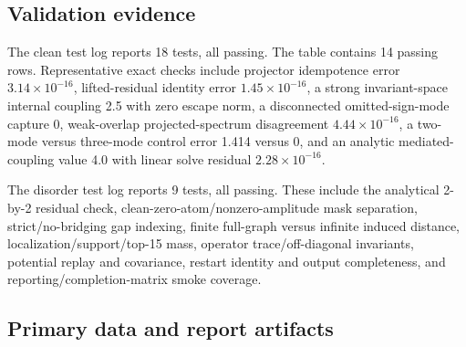 \documentclass[11pt]{article}
\begin{document}
\subsection{Validation evidence}

The clean test log
reports 18 tests, all passing.  The table
contains 14 passing rows.  Representative exact checks include projector idempotence error
\(3.14\times10^{-16}\), lifted-residual identity error \(1.45\times10^{-16}\), a strong invariant-space internal coupling 2.5 with zero escape norm, a disconnected omitted-sign-mode capture 0, weak-overlap projected-spectrum disagreement \(4.44\times10^{-16}\), a two-mode versus three-mode control error 1.414 versus 0, and an analytic mediated-coupling value 4.0 with linear solve residual \(2.28\times10^{-16}\).

The disorder test log
reports 9 tests, all passing.  These include the analytical 2-by-2 residual check, clean-zero-atom/nonzero-amplitude mask separation, strict/no-bridging gap indexing, finite full-graph versus infinite induced distance, localization/support/top-15 mass, operator trace/off-diagonal invariants, potential replay and covariance, restart identity and output completeness, and reporting/completion-matrix smoke coverage.

\subsection{Primary data and report artifacts}
\end{document}
